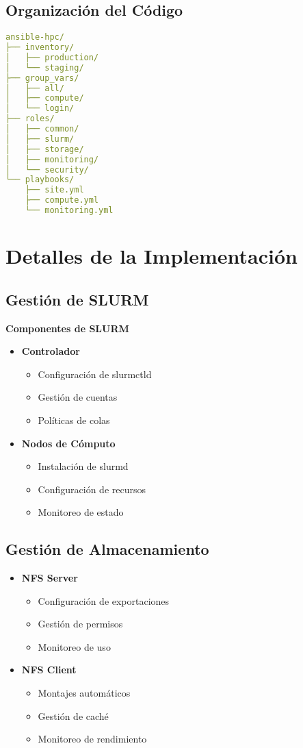 \subsection{Organización del Código}
\begin{lstlisting}[language=yaml]
ansible-hpc/
├── inventory/
│   ├── production/
│   └── staging/
├── group_vars/
│   ├── all/
│   ├── compute/
│   └── login/
├── roles/
│   ├── common/
│   ├── slurm/
│   ├── storage/
│   ├── monitoring/
│   └── security/
└── playbooks/
    ├── site.yml
    ├── compute.yml
    └── monitoring.yml
\end{lstlisting}

\section{Detalles de la Implementación}
\subsection{Gestión de SLURM}
\begin{infocaja}
\textbf{Componentes de SLURM}
\begin{itemize}
    \item \textbf{Controlador}
    \begin{itemize}
        \item Configuración de slurmctld
        \item Gestión de cuentas
        \item Políticas de colas
    \end{itemize}
    \item \textbf{Nodos de Cómputo}
    \begin{itemize}
        \item Instalación de slurmd
        \item Configuración de recursos
        \item Monitoreo de estado
    \end{itemize}
\end{itemize}
\end{infocaja}

\subsection{Gestión de Almacenamiento}
\begin{itemize}
    \item \textbf{NFS Server}
    \begin{itemize}
        \item Configuración de exportaciones
        \item Gestión de permisos
        \item Monitoreo de uso
    \end{itemize}
    \item \textbf{NFS Client}
    \begin{itemize}
        \item Montajes automáticos
        \item Gestión de caché
        \item Monitoreo de rendimiento
    \end{itemize}
\end{itemize}

